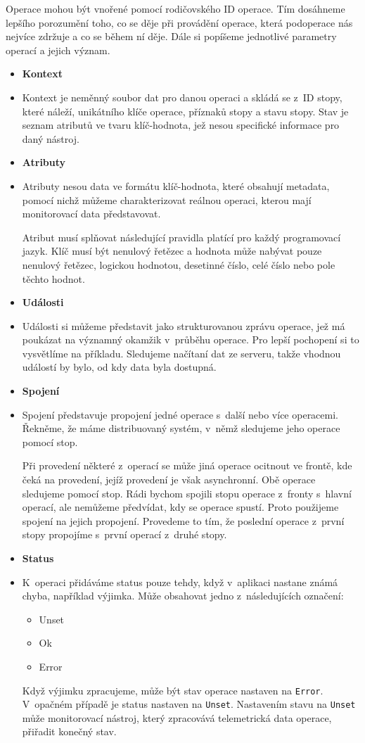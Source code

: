 Operace mohou být vnořené pomocí rodičovského ID operace. Tím dosáhneme lepšího porozumění toho, co se děje při provádění operace, která podoperace nás nejvíce zdržuje a co se během ní děje. Dále si popíšeme jednotlivé parametry operací a jejich význam.
    \begin{itemize}
    \item{\textbf{Kontext}}
    \item[]
    Kontext je neměnný soubor dat pro danou operaci a skládá se z~ID stopy, které náleží, unikátního klíče operace, příznaků stopy a stavu stopy. Stav je seznam atributů ve tvaru klíč-hodnota, jež nesou specifické informace pro daný nástroj.
    \item{\textbf{Atributy}}
    \item[]
    Atributy nesou data ve formátu klíč-hodnota, které obsahují metadata, pomocí nichž můžeme charakterizovat reálnou operaci, kterou mají monitorovací data představovat.

    Atribut musí splňovat následující pravidla platící pro každý programovací jazyk. Klíč musí být nenulový řetězec a hodnota může nabývat pouze nenulový řetězec, logickou hodnotou, desetinné číslo, celé číslo nebo pole těchto hodnot.
    \item{\textbf{Události}}
    \item[]
    Události si můžeme představit jako strukturovanou zprávu operace, jež má poukázat na významný okamžik v~průběhu operace. Pro lepší pochopení si to vysvětlíme na příkladu. Sledujeme načítaní dat ze serveru, takže vhodnou událostí by bylo, od kdy data byla dostupná.
    \item{\textbf{Spojení}}
    \item[]
    Spojení představuje propojení jedné operace s~další nebo více operacemi. Řekněme, že máme distribuovaný systém, v~němž sledujeme jeho operace pomocí stop.

    Při provedení některé z~operací se může jiná operace ocitnout ve frontě, kde čeká na provedení, jejíž provedení je však asynchronní. Obě operace sledujeme pomocí stop. Rádi bychom spojili stopu operace z~fronty s~hlavní operací, ale nemůžeme předvídat, kdy se operace spustí. Proto použijeme spojení na jejich propojení. Provedeme to tím, že poslední operace z~první stopy propojíme s~první operací z~druhé stopy.
    \item{\textbf{Status}}
    \item[]
    K~operaci přidáváme status pouze tehdy, když v~aplikaci nastane známá chyba, například výjimka. Může obsahovat jedno z~následujících označení:
    \begin{itemize}
        \item{Unset}
        \item{Ok}
        \item{Error}
    \end{itemize}
    Když výjimku zpracujeme, může být stav operace nastaven na \texttt{Error}. V~opačném případě je status nastaven na \texttt{Unset}. Nastavením stavu na \texttt{Unset} může monitorovací nástroj, který zpracovává telemetrická data operace, přiřadit konečný stav.
    \end{itemize}

